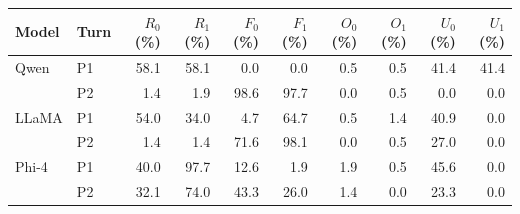 \begingroup
\setlength{\tabcolsep}{2.2pt}
\begin{tabular}{@{}llrrrrrrrr@{}}
\toprule
Model & Turn & $R_0$ (\%) & $R_1$ (\%) & $F_0$ (\%) & $F_1$ (\%) & $O_0$ (\%) & $O_1$ (\%) & $U_0$ (\%) & $U_1$ (\%) \\
\midrule
Qwen & P1 & 58.1 & 58.1 & 0.0 & 0.0 & 0.5 & 0.5 & 41.4 & 41.4 \\
 & P2 & 1.4 & 1.9 & 98.6 & 97.7 & 0.0 & 0.5 & 0.0 & 0.0 \\
\addlinespace
LLaMA & P1 & 54.0 & 34.0 & 4.7 & 64.7 & 0.5 & 1.4 & 40.9 & 0.0 \\
 & P2 & 1.4 & 1.4 & 71.6 & 98.1 & 0.0 & 0.5 & 27.0 & 0.0 \\
\addlinespace
Phi-4 & P1 & 40.0 & 97.7 & 12.6 & 1.9 & 1.9 & 0.5 & 45.6 & 0.0 \\
 & P2 & 32.1 & 74.0 & 43.3 & 26.0 & 1.4 & 0.0 & 23.3 & 0.0 \\
\bottomrule
\end{tabular}
\endgroup